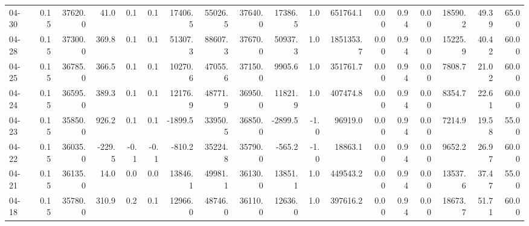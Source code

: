 \begin{threeparttable}
{\begin{tabular}{lrrrrrrrrrrrrrrrrr}
  04-30 &     0.15 & 37620.0 &              41.0 &               0.1 &                0.1 &            17406.5 & 55026.5 & 37640.0 &    17386.5 &                      1.0 &            651764.1 &       0.00 &      0.94 &           0.00 &          18590.2 &           49.39 &                  65.00 \\
  04-28 &     0.15 & 37300.0 &             369.8 &               0.1 &                0.1 &            51307.3 & 88607.3 & 37670.0 &    50937.3 &                      1.0 &           1851353.7 &       0.00 &      0.94 &           0.00 &          15225.9 &           40.42 &                  60.00 \\
  04-25 &     0.15 & 36785.0 &             366.5 &               0.1 &                0.1 &            10270.6 & 47055.6 & 37150.0 &     9905.6 &                      1.0 &            351761.7 &       0.00 &      0.94 &           0.00 &           7808.7 &           21.02 &                  60.00 \\
  04-24 &     0.15 & 36595.0 &             389.3 &               0.1 &                0.1 &            12176.9 & 48771.9 & 36950.0 &    11821.9 &                      1.0 &            407474.8 &       0.00 &      0.94 &           0.00 &           8354.7 &           22.61 &                  60.00 \\
  04-23 &     0.15 & 35850.0 &             926.2 &               0.1 &                0.1 &            -1899.5 & 33950.5 & 36850.0 &    -2899.5 &                     -1.0 &             96919.0 &       0.00 &      0.94 &           0.00 &           7214.9 &           19.58 &                  55.00 \\
  04-22 &     0.15 & 36035.0 &            -229.5 &              -0.1 &               -0.1 &             -810.2 & 35224.8 & 35790.0 &     -565.2 &                     -1.0 &             18863.1 &       0.00 &      0.94 &           0.00 &           9652.2 &           26.97 &                  60.00 \\
  04-21 &     0.15 & 36135.0 &              14.0 &               0.0 &                0.0 &            13846.1 & 49981.1 & 36130.0 &    13851.1 &                      1.0 &            449543.2 &       0.00 &      0.94 &           0.00 &          13537.6 &           37.47 &                  55.00 \\
  04-18 &     0.15 & 35780.0 &             310.9 &               0.2 &                0.1 &            12966.0 & 48746.0 & 36110.0 &    12636.0 &                      1.0 &            397616.2 &       0.00 &      0.94 &           0.00 &          18673.7 &           51.71 &                  60.00 \\

\end{tabular}}
\end{threeparttable}
